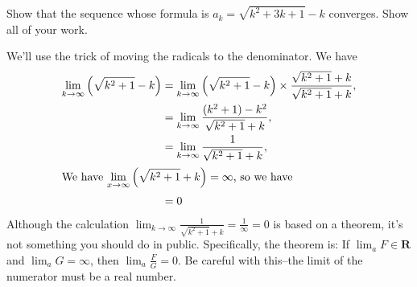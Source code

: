 \documentclass[12pt]{exam}
\newcommand{\reals}{\mathbf{R}}
\begin{document}
\begin{questions}
  \question  Show that the sequence whose formula is 
  $a_k = \sqrt{k^2+ 3 k + 1} - k$ converges. Show all of your work.
  \begin{solution}%
  We'll use the trick of moving the radicals to the denominator. We have
  \begin{align*}
  \lim_{k \to \infty} \left(\sqrt{k^2+1} - k \right)  &= \lim_{k \to \infty} \left(\sqrt{k^2+1} - k \right)   \times \frac{\sqrt{k^2+1}  + k}{\sqrt{k^2+1}  + k}, \\
                                                                 &= \lim_{k \to \infty} \frac{(k^2+1) - k^2}{\sqrt{k^2+1}  + k}, \\
                                                                 &=  \lim_{k \to \infty} \frac{1}{\sqrt{k^2+1}  + k}, \\
      \intertext{We have $\displaystyle \lim_{x \to \infty}   \left( \sqrt{k^2+1}  + k \right) = \infty$, so we have}                                                        
                                                                 &=  0
  \end{align*}
  Although the calculation $\displaystyle \lim_{k \to \infty} \frac{1}{\sqrt{k^2+1}  + k} = \frac{1}{\infty} = 0$ is based on a theorem, it's not   
  something you should do in public. Specifically, the theorem is: 
  If $\displaystyle \lim_a   F \in \reals$ and $\displaystyle \lim_a G = \infty$,
  then $\displaystyle \lim_a \frac{F}{G} = 0$. Be careful with this--the limit of the numerator must be a real number.
  \end{solution}


\end{questions}
\end{document}
